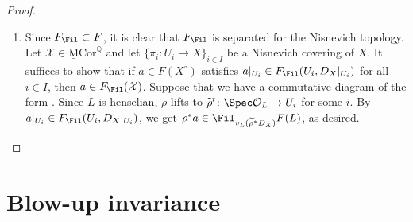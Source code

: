 \documentclass{amsart}
\theoremstyle{plain}
\theoremstyle{definition}
\theoremstyle{remark}
\numberwithin{equation}{section}
\def\MCor{\mathrm{\underline{M}Cor}}
\begin{document}
\begin{proof}
\begin{enumerate}
        Since $\overline{V}^N$ is proper over $X$, the canonical morphism $\Spec L_i\to V^N$ uniquely extends to $\Spec \mathcal{O}_{L_i} \to \overline{V}^N$.
        We write $\widetilde{\pi}_i \colon \Spec \mathcal{O}_{L_i}\to \Spec \mathcal{O}_L$ and $\widetilde{\eta}_i\colon \Spec \mathcal{O}_{L_i}\to Y$ for the induced morphisms.
        Pulling back the inequality $(\pr_1^*D_X)|_{\overline{V}^N}\geq (\pr_2^*D_Y)|_{\overline{V}^N}$ to $\Spec \mathcal{O}_{L_i}$, we get $\widetilde{\pi}_i^*\widetilde{\rho}^*D_X\geq \widetilde{\eta}_i^*D_Y$.
        Consider the following commutative diagram:
        $$
        \xymatrix{
            \Spec L_i\ar[r]^-{\eta_i}\ar@{^(->}[d]             &Y^\circ\ar@{^(->}[d]\\
            \Spec \mathcal{O}_{L_i}\ar[r]^-{\widetilde{\eta}_i}       &Y.
        }
        $$
        Since $b\in F_{\Fil}(\mathcal{Y})$, we have $\eta_i^*b\in \Fil_{v_{L_i}(\widetilde{\eta}_i^*D_Y)}F(L_i)$.
        The above inequality shows that $\eta_i^*b\in \Fil_{v_{L_i}(\widetilde{\pi}_i^*\widetilde{\rho}^*D_X)}F(L_i)$.
        If $L_i/L$ has ramification index $e_i$, then we have $v_{L_i}(\pi_i^*\widetilde{\rho}^*D_X)=e_i\cdot v_L(\widetilde{\rho}^*D_X)$.
        By the definition of a ramification filtration, we get $\pi_{i,*}\eta_i^*b\in \Fil_{v_L(\widetilde{\rho}^*D_X)}F(L)$, as desired.
        \item Since $F_{\Fil}\subset F$, it is clear that $F_{\Fil}$ is separated for the Nisnevich topology.
        Let $\mathcal{X}\in \MCor^{\mathbb{Q}}$ and let $\{\pi_i\colon U_i\to X\}_{i\in I}$ be a Nisnevich covering of $X$.
        It suffices to show that if $a\in F(X^\circ)$ satisfies $a|_{U_i}\in F_{\Fil}(U_i,D_X|_{U_i})$ for all $i\in I$, then $a\in F_{\Fil}(\mathcal{X})$.
        Suppose that we have a commutative diagram of the form .
        Since $L$ is henselian, $\widetilde{\rho}$ lifts to $\widetilde{\rho}'\colon \Spec \mathcal{O}_L\to U_i$ for some $i$.
        By $a|_{U_i}\in F_{\Fil}(U_i,D_X|_{U_i})$, we get $\rho^*a\in \Fil_{v_L(\widetilde{\rho}^*D_X)}F(L)$, as desired.\qedhere
    \end{enumerate}
\end{proof}





\section{Blow-up invariance}\label{section_main}
\end{document}
